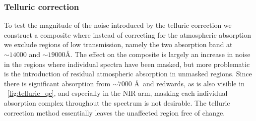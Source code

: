 \documentclass{aa}    %
\newcommand{\figref}[1]{\ref{fig:#1}}
\newcommand{\Fig}[1]{\figurename~\figref{#1}}
\newcommand{\fig}[1]{\Fig{#1}}
\newcommand{\sectlabel}[1]{\label{sect:#1}}
\begin{document}
\subsubsection{Telluric correction}  \sectlabel{Telluric correction}
To test the magnitude of the noise introduced by the telluric correction we
construct a composite where instead of correcting for the atmospheric absorption
we exclude regions of low transmission, namely the two absorption band at $\sim
14000$ and $\sim 19000$\AA. The effect on the composite is largely an increase
in noise in the regions where individual spectra have been masked, but more
problematic is the introduction of residual atmospheric absorption in unmasked
regions. Since there is significant absorption from $\sim 7000$ \AA~and
redwards, as is also visible in \fig{telluric_qc}, and especially in the NIR
arm, masking each individual absorption complex throughout the spectrum is not
desirable. The telluric correction method essentially leaves the unaffected
region free of change. 



 
\end{document}
